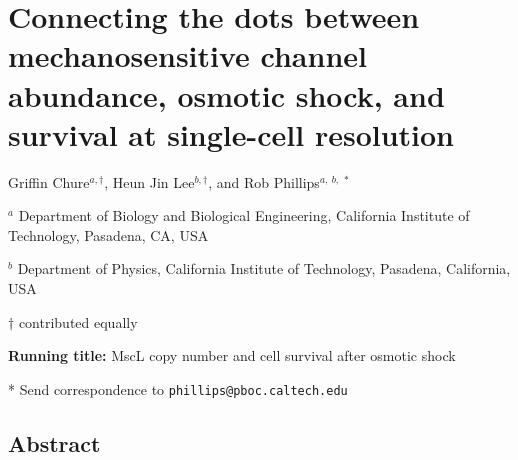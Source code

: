 \newcommand{\plusnamesingular}{}
\newcommand{\starnamesingular}{}
\newcommand{\xrefname}[1]{\protect\renewcommand{\plusnamesingular}{#1}}
\newcommand{\Xrefname}[1]{\protect\renewcommand{\starnamesingular}{#1}}
\providecommand{\cref}{\plusnamesingular~\ref}
\providecommand{\Cref}{\starnamesingular~\ref}
\providecommand{\crefformat}[2]{}
\providecommand{\Crefformat}[2]{}

\crefformat{equation}{Eq.~#2#1#3}
\Crefformat{equation}{Equation~#2#1#3}

\section{Connecting
the
dots
between
mechanosensitive
channel
abundance,
osmotic
shock,
and
survival
at
single-cell
resolution}\label{connecting-the-dots-between-mechanosensitive-channel-abundance-osmotic-shock-and-survival-at-single-cell-resolution}

Griffin
Chure\(^{a, \dagger}\),
Heun
Jin
Lee\(^{b, \dagger}\),
and
Rob
Phillips\(^{a,\ b,\ *}\)

\(^a\)
Department
of
Biology
and
Biological
Engineering,
California
Institute
of
Technology,
Pasadena,
CA,
USA

\(^b\)
Department
of
Physics,
California
Institute
of
Technology,
Pasadena,
California,
USA

\(\dagger\)
contributed
equally

\textbf{Running
title:}
MscL
copy
number
and
cell
survival
after
osmotic
shock

* Send
correspondence
to
\texttt{phillips@pboc.caltech.edu}

\subsection{Abstract}\label{abstract}

